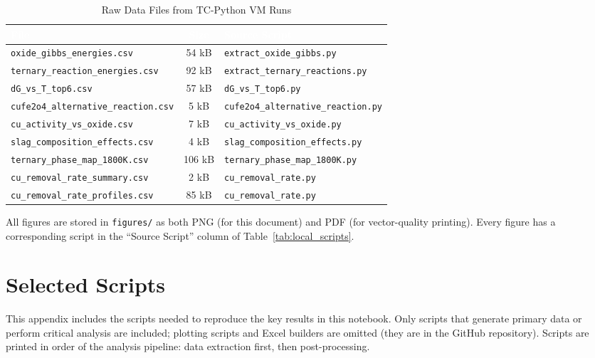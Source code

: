 \documentclass[11pt]{article}
\begin{document}
\begin{table}[H]
\caption{Raw Data Files from TC-Python VM Runs}
\label{tab:data_files}
\centering
\renewcommand{\arraystretch}{1.15}
\footnotesize
\begin{tabular}{|p{2.8in}|c|p{2.2in}|}
\hline
\rowcolor{headercolor}
\textcolor{white}{\textbf{File}} & \textcolor{white}{\textbf{Size}} & \textcolor{white}{\textbf{Source Script}} \\
\hline
\texttt{oxide\_gibbs\_energies.csv} & 54 kB & \texttt{extract\_oxide\_gibbs.py} \\
\hline
\rowcolor{altrow}
\texttt{ternary\_reaction\_energies.csv} & 92 kB & \texttt{extract\_ternary\_reactions.py} \\
\hline
\texttt{dG\_vs\_T\_top6.csv} & 57 kB & \texttt{dG\_vs\_T\_top6.py} \\
\hline
\rowcolor{altrow}
\texttt{cufe2o4\_alternative\_reaction.csv} & 5 kB & \texttt{cufe2o4\_alternative\_reaction.py} \\
\hline
\texttt{cu\_activity\_vs\_oxide.csv} & 7 kB & \texttt{cu\_activity\_vs\_oxide.py} \\
\hline
\rowcolor{altrow}
\texttt{slag\_composition\_effects.csv} & 4 kB & \texttt{slag\_composition\_effects.py} \\
\hline
\texttt{ternary\_phase\_map\_1800K.csv} & 106 kB & \texttt{ternary\_phase\_map\_1800K.py} \\
\hline
\rowcolor{altrow}
\texttt{cu\_removal\_rate\_summary.csv} & 2 kB & \texttt{cu\_removal\_rate.py} \\
\hline
\texttt{cu\_removal\_rate\_profiles.csv} & 85 kB & \texttt{cu\_removal\_rate.py} \\
\hline
\end{tabular}
\end{table}

All figures are stored in \texttt{figures/} as both PNG (for this document) and PDF (for vector-quality printing). Every figure has a corresponding script in the ``Source Script'' column of Table~\ref{tab:local_scripts}.


\newpage
\section{Selected Scripts}
\label{sec:scripts}

This appendix includes the scripts needed to reproduce the key results in this notebook. Only scripts that generate primary data or perform critical analysis are included; plotting scripts and Excel builders are omitted (they are in the GitHub repository). Scripts are printed in order of the analysis pipeline: data extraction first, then post-processing.
\end{document}
